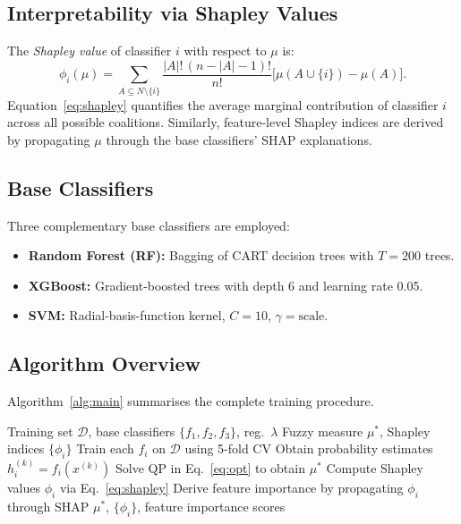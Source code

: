 \documentclass[10pt,twocolumn]{article}
\begin{document}
\subsection{Interpretability via Shapley Values}

The \emph{Shapley value} of classifier $i$ with respect to $\mu$ is:
\begin{equation}
  \phi_i(\mu) = \sum_{A \subseteq N\setminus\{i\}}
    \frac{|A|!\,(n-|A|-1)!}{n!}
    \bigl[\mu(A\cup\{i\}) - \mu(A)\bigr].
  \label{eq:shapley}
\end{equation}
Equation~\eqref{eq:shapley} quantifies the average marginal contribution of classifier $i$
across all possible coalitions. Similarly, feature-level Shapley indices are derived by
propagating $\mu$ through the base classifiers' SHAP explanations.

\subsection{Base Classifiers}

Three complementary base classifiers are employed:
\begin{itemize}
  \item \textbf{Random Forest (RF):} Bagging of CART decision trees with $T{=}200$ trees.
  \item \textbf{XGBoost:} Gradient-boosted trees with depth 6 and learning rate 0.05.
  \item \textbf{SVM:} Radial-basis-function kernel, $C{=}10$, $\gamma{=}\text{scale}$.
\end{itemize}

\subsection{Algorithm Overview}

Algorithm~\ref{alg:main} summarises the complete training procedure.

\begin{algorithm}[H]
\caption{Fuzzy Integral Ensemble Training}
\label{alg:main}
\begin{algorithmic}[1]
\Require Training set $\mathcal{D}$, base classifiers $\{f_1, f_2, f_3\}$, reg.\ $\lambda$
\Ensure Fuzzy measure $\mu^{*}$, Shapley indices $\{\phi_i\}$
\State Train each $f_i$ on $\mathcal{D}$ using 5-fold CV
\State Obtain probability estimates $h_i^{(k)} = f_i(x^{(k)})$
\State Solve QP in Eq.~\eqref{eq:opt} to obtain $\mu^{*}$
\State Compute Shapley values $\phi_i$ via Eq.~\eqref{eq:shapley}
\State Derive feature importance by propagating $\phi_i$ through SHAP
\State \Return $\mu^{*}$, $\{\phi_i\}$, feature importance scores
\end{algorithmic}
\end{algorithm}
\end{document}
